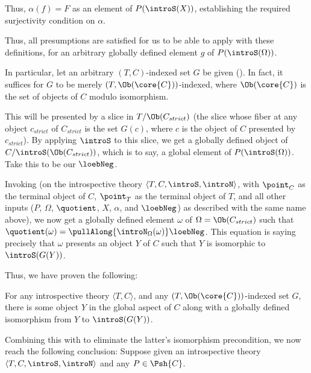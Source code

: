 Thus, $\alpha(f) = F$ as an element of $P(\introS(X))$, establishing the required surjectivity condition on $\alpha$.

Thus, all presumptions are satisfied for us to be able to apply  with these definitions, for an arbitrary globally defined element $g$ of $P(\introS(\Omega))$.

In particular, let an arbitrary $(T, C)$-indexed set $G$ be given (). In fact, it suffices for $G$ to be merely $(T, \Ob(\core{C}))$-indexed, where $\Ob(\core{C})$ is the set of objects of $C$ modulo isomorphism.

This will be presented by a slice in $T/\Ob(C_{strict})$ (the slice whose fiber at any object $c_{strict}$ of $C_{strict}$ is the set $G(c)$, where $c$ is the object of $C$ presented by $c_{strict}$). By applying $\introS$ to this slice, we get a globally defined object of $C/\introS(\Ob(C_{strict}))$, which is to say, a global element of $P(\introS(\Omega))$. Take this to be our $\loebNeg$.

Invoking  (on the introspective theory $\langle T, C, \introS, \introN \rangle$, with $\point_C$ as the terminal object of $C$, $\point_T$ as the terminal object of $T$, and all other inputs ($P$, $\Omega$, $\quotient$, $X$, $\alpha$, and $\loebNeg$) as described with the same name above), we now get a globally defined element $\omega$ of $\Omega = \Ob(C_{strict})$ such that $\quotient(\omega) = \pullAlong{\introN_{\Omega}(\omega)} \loebNeg$. This equation is saying precisely that $\omega$ presents an object $Y$ of $C$ such that $Y$ is isomorphic to $\introS(G(Y))$. 

Thus, we have proven the following:
\begin{theorem}\label{IntrospTyConFixedPoints}
For any introspective theory $\langle T, C \rangle$, and any  $(T, \Ob(\core{C}))$-indexed set $G$, there is some object $Y$ in the global aspect of $C$ along with a globally defined isomorphism from $Y$ to $\introS(G(Y))$.
\end{theorem}

Combining this with  to eliminate the latter's isomorphism precondition, we now reach the following conclusion:
\label{IntrospLoeb}
Suppose given an introspective theory $\langle T, C, \introS, \introN \rangle$ and any $P \in \Psh{C}$.

